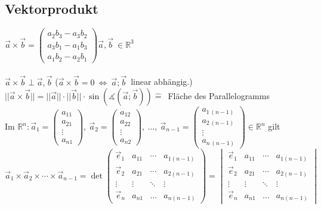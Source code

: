 \documentclass[6pt,a4paper]{scrartcl}
\newcommand{\R}{\ensuremath{\mathbb R}}
\begin{document}
\begin{multicols}{3}
\subsection{Vektorprodukt}
$\vec a\times\vec b=\left( \begin{matrix} a_2b_3-a_3b_2\\a_3b_1-a_1b_3\\a_1b_2-a_2b_1\end{matrix}\right)$\qquad $\vec a,\vec b\ \in \mathbb R^3$\\
\\
$\vec a\times\vec b \perp \vec a,\vec b$ \qquad ($\vec a\times\vec b=0\ \Leftrightarrow\ \vec a;\vec b$\ linear abhängig.)\\
$||\vec a\times\vec b||=||\vec a||\cdot||\vec b||\cdot \sin\left(\measuredangle (\vec a;\vec b)\right)\mathrel{\widehat{=}}$\ Fläche des Parallelogramms\\
Im $\R^n: {\vec a}_{1}={\begin{pmatrix}a_{{11}}\\a_{{21}}\\\vdots \\a_{{n1}}\end{pmatrix}},\ {\vec a}_{2}={\begin{pmatrix}a_{{12}}\\a_{{22}}\\\vdots \\a_{{n2}}\end{pmatrix}},\ \dots ,\ {\vec a}_{{n-1}}={\begin{pmatrix}a_{{1\,(n-1)}}\\a_{{2\,(n-1)}}\\\vdots \\a_{{n\,(n-1)}}\end{pmatrix}}\in \R^n $ gilt ${\vec a}_{1}\times {\vec a}_{2}\times \cdots \times {\vec a}_{{n-1}}=\det {\begin{pmatrix}{\vec e}_{1}&a_{{11}}&\cdots &a_{{1(n-1)}}\\{\vec e}_{2}&a_{{21}}&\cdots &a_{{2(n-1)}}\\\vdots &\vdots &\ddots &\vdots \\{\vec e}_{n}&a_{{n1}}&\dots &a_{{n(n-1)}}\end{pmatrix}}={\begin{vmatrix}{\vec e}_{1}&a_{{11}}&\cdots &a_{{1(n-1)}}\\{\vec e}_{2}&a_{{21}}&\cdots &a_{{2(n-1)}}\\\vdots &\vdots &\ddots &\vdots \\{\vec e}_{n}&a_{{n1}}&\dots &a_{{n(n-1)}}\end{vmatrix}}$

\end{multicols}
\end{document}
